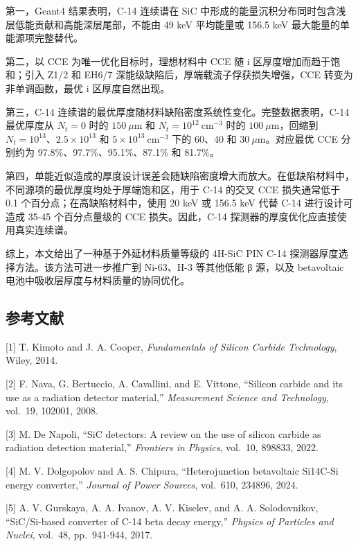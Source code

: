 \documentclass[
  10pt,
  a4paper,
]{ctexart}
\begin{document}
第一，Geant4 结果表明，C-14 连续谱在 SiC
中形成的能量沉积分布同时包含浅层低能贡献和高能深层尾部，不能由 49 keV
平均能量或 156.5 keV 最大能量的单能源项完整替代。

第二，以 CCE 为唯一优化目标时，理想材料中 CCE 随 i
区厚度增加而趋于饱和；引入 Z1/2 和 EH6/7
深能级缺陷后，厚端载流子俘获损失增强，CCE 转变为非单调函数，最优 i
区厚度自然出现。

第三，C-14 连续谱的最优厚度随材料缺陷密度系统性变化。完整数据表明，C-14
最优厚度从 \(N_t=0\) 时的 \(150\ \mu\mathrm{m}\) 和
\(N_t=10^{12}\ \mathrm{cm^{-3}}\) 时的 \(100\ \mu\mathrm{m}\)，回缩到
\(N_t=10^{13}\)、\(2.5\times10^{13}\) 和
\(5\times10^{13}\ \mathrm{cm^{-3}}\) 下的 60、40 和
\(30\ \mu\mathrm{m}\)。对应最优 CCE 分别约为
97.8\%、97.7\%、95.1\%、87.1\% 和 81.7\%。

第四，单能近似造成的厚度设计误差会随缺陷密度增大而放大。在低缺陷材料中，不同源项的最优厚度均处于厚端饱和区，用于
C-14 的交叉 CCE 损失通常低于 0.1 个百分点；在高缺陷材料中，使用 20 keV
或 156.5 keV 代替 C-14 进行设计可造成 35-45 个百分点量级的 CCE
损失。因此，C-14 探测器的厚度优化应直接使用真实连续谱。

综上，本文给出了一种基于外延材料质量等级的 4H-SiC PIN C-14
探测器厚度选择方法。该方法可进一步推广到 Ni-63、H-3 等其他低能 β
源，以及 betavoltaic 电池中吸收层厚度与材料质量的协同优化。

\subsection{参考文献}\label{ux53c2ux8003ux6587ux732e}

{[}1{]} T. Kimoto and J. A. Cooper, \emph{Fundamentals of Silicon
Carbide Technology}, Wiley, 2014.

{[}2{]} F. Nava, G. Bertuccio, A. Cavallini, and E. Vittone, ``Silicon
carbide and its use as a radiation detector material,''
\emph{Measurement Science and Technology}, vol.~19, 102001, 2008.

{[}3{]} M. De Napoli, ``SiC detectors: A review on the use of silicon
carbide as radiation detection material,'' \emph{Frontiers in Physics},
vol.~10, 898833, 2022.

{[}4{]} M. V. Dolgopolov and A. S. Chipura, ``Heterojunction betavoltaic
Si14C-Si energy converter,'' \emph{Journal of Power Sources}, vol.~610,
234896, 2024.

{[}5{]} A. V. Gurskaya, A. A. Ivanov, A. V. Kiselev, and A. A.
Solodovnikov, ``SiC/Si-based converter of C-14 beta decay energy,''
\emph{Physics of Particles and Nuclei}, vol.~48, pp.~941-944, 2017.
\end{document}
